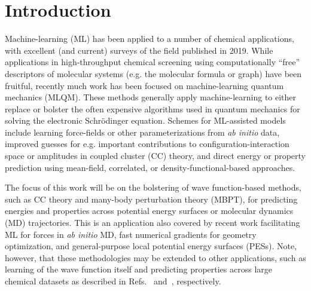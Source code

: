 \section{Introduction} \label{intro}

Machine-learning (ML) has been applied to a number of chemical applications, with excellent (and current) surveys of the field published in 2019\cite{Haghighatlari2019a,Elton2019}. While applications in high-throughput chemical screening using computationally ``free'' descriptors of molecular systems (e.g. the molecular formula or graph) have been fruitful\cite{}, recently much work has been focused on machine-learning quantum mechanics (MLQM)\cite{}. These methods generally apply machine-learning to either replace or bolster the often expensive algorithms used in quantum mechanics for solving the electronic Schr\"{o}dinger equation. 
Schemes for ML-assisted models include learning force-fields or other parameterizations from \textit{ab initio} data\cite{Sauceda2019,Galvelis2019}, improved guesses for e.g. important contributions to configuration-interaction space\cite{Coe2018} or amplitudes in coupled cluster (CC) theory\cite{Townsend2019}, and direct energy or property prediction using mean-field, correlated, or density-functional-based approaches\cite{Welborn2018a,Cheng2019,Yuan2019,Wilkins2019,Smitha}. 

The focus of this work will be on the bolstering of wave function-based methods, such as CC theory\cite{Crawford2000} and many-body perturbation theory (MBPT)\cite{Coester1960a,Bartlett1981}, for predicting energies and properties across potential energy surfaces or molecular dynamics (MD) trajectories. 
This is an application also covered by recent work facilitating ML for forces in \textit{ab initio} MD\cite{Chmiela2018}, fast numerical gradients for geometry optimization\cite{Schmitz2018a}, and general-purpose local potential energy surfaces (PESs)\cite{Abbott}. Note, however, that these methodologies may be extended to other applications, such as learning of the wave function itself and predicting properties across large chemical datasets as described in Refs.~ and~, respectively.  

